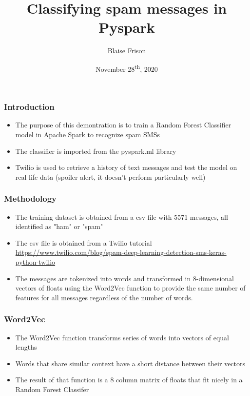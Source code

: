 \documentclass[]{beamer}
\title{Classifying spam messages in Pyspark}
\author{Blaise Frison}
\institute{CEBD1261 Big Data Infrastructure}
\date{November 28\textsuperscript{th}, 2020}
\begin{document}
\begin{frame}
  \titlepage
\end{frame}

\begin{frame}
  \frametitle{Introduction}

  \begin{itemize}
  \item The purpose of this demontration is to train a Random Forest Classifier model in Apache Spark to recognize spam SMSs
  \item The classifier is imported from the pyspark.ml library
  \item Twilio is used to retrieve a history of text messages and test the model on real life data (spoiler alert, it doesn't perform particularly well)
  \end{itemize}
\end{frame}

\begin{frame}
  \frametitle{Methodology}

  \begin{itemize}
  \item The training dataset is obtained from a csv file with 5571 messages, all identified as "ham" or "spam"
  \item The csv file is obtained from a Twilio tutorial \url{https://www.twilio.com/blog/spam-deep-learning-detection-sms-keras-python-twilio}
  \item The messages are tokenized into words and transformed in 8-dimensional vectors of floats using the Word2Vec function to provide the same number of features for all messages regardless of the number of words.
  \end{itemize}
\end{frame}

\begin{frame}
  \frametitle{Word2Vec}

  \begin{itemize}
  \item The Word2Vec function transforms series of words into vectors of equal lengths
  \item Words that share similar context have a short distance between their vectors
  \item The result of that function is a 8 column matrix of floats that fit nicely in a Random Forest Classifer
  \end{itemize}
\end{frame}
\end{document}
